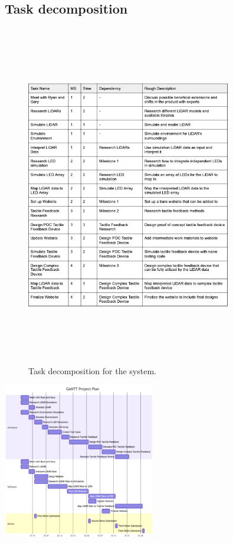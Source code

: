 \documentclass{article}
\begin{document}
\subsection{Task decomposition} 

    

\begin{figure}[h]
\begin{center}
  \includegraphics[width=0.8\textwidth,height=15cm]{decomposition.png}
  \caption{Task decomposition for the system.}
  \end{center}
\end{figure}


\begin{center}
    \includegraphics [width=0.5\textwidth]{Gantt PP.png}
\end{center}
\end{document}
